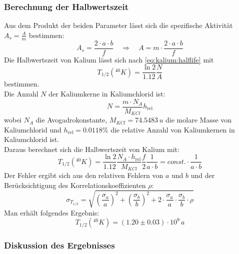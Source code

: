 \subsubsection{Berechnung der Halbwertszeit}
Aus dem Produkt der beiden Parameter lässt sich die spezifische Aktivität $A_s = \frac{A}{m}$ bestimmen:
\begin{equation}
  A_s = \frac{2 \cdot a \cdot b}{f} \quad \Rightarrow \quad A = m \cdot \frac{2 \cdot a \cdot b}{f}
\end{equation}
Die Halbwertszeit von Kalium lässt sich nach \eqref{eq:kalium:halflife} mit %
\begin{equation}
  T_{1/2}({}^{40}K) = \frac{\ln 2}{1.12} \frac{N}{A}
\end{equation}
bestimmen. \\
Die Anzahl $N$ der Kaliumkerne in Kaliumchlorid ist:
\begin{equation}
  N = \frac{m \cdot N_A}{M_{KCl}} h_{\text{rel}}
\end{equation}
wobei $N_A$ die Avogadrokonstante, $M_{KCl}=74.5483\,u$ die molare Masse von Kaliumchlorid und $h_{\text{rel}}=0.0118\%$ die relative Anzahl von Kaliumkernen 
in Kaliumchlorid ist. \\
Daraus berechnet sich die Halbwertszeit von Kalium mit:
\begin{equation}
  T_{1/2} \left( {}^{40} K \right)  = \frac{\ln 2}{1.12} \frac{N_A \cdot h_{\text{rel}}}{M_{KCl}} \frac{f}{2} \frac{1}{a \cdot b} = const. \cdot \frac{1}{a \cdot b}
\end{equation}
Der Fehler ergibt sich aus den relativen Fehlern von $a$ und $b$ und der Berücksichtigung des Korrelationskoeffizienten $\rho$:
\begin{equation}
  \sigma_{T_{1/2}} = \sqrt{ \left( \frac{\sigma_a}{a} \right)^2 + \left( \frac{\sigma_b}{b} \right)^2 + 2 \cdot \frac{\sigma_a}{a} \cdot \frac{\sigma_b}{b} \cdot \rho   }
\end{equation}
Man erhält folgendes Ergebnis:
\begin{equation}
  T_{1/2} \left( {}^{40} K \right) = (1.20 \pm 0.03) \cdot 10^9\,a  
\end{equation}

\subsubsection{Diskussion des Ergebnisses}


